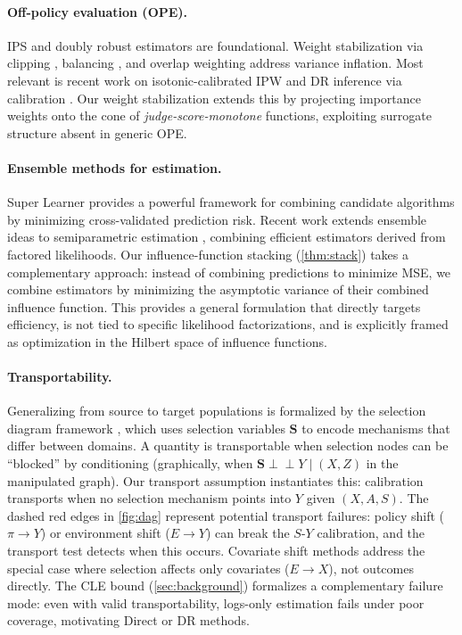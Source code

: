 \paragraph{Off-policy evaluation (OPE).}
IPS \citep{HorvitzThompson1952,Hajek1964Rejective} and doubly robust estimators \citep{BangRobins2005,JiangLi2016,KallusUehara2020DRL} are foundational.
Weight stabilization via clipping \citep{Ionides2008TruncatedIS}, balancing \citep{Kallus2018Balanced}, and overlap weighting \citep{LiMorganZaslavsky2018,Crump2009LimitedOverlap} address variance inflation.
Most relevant is recent work on isotonic-calibrated IPW \citep{vanDerLaanLinCaroneLuedtke2025StabIPW} and DR inference via calibration \citep{vanDerLaanLuedtkeCarone2024DRCalibration}.
Our weight stabilization extends this by projecting importance weights onto the cone of \emph{judge-score-monotone} functions, exploiting surrogate structure absent in generic OPE.

\paragraph{Ensemble methods for estimation.}
Super Learner \citep{vanderLaan2007SuperLearner} provides a powerful framework for combining candidate algorithms by minimizing cross-validated prediction risk.
Recent work extends ensemble ideas to semiparametric estimation \citep{ShinLiuColeFine2020EnsembleSemiparametric}, combining efficient estimators derived from factored likelihoods.
Our influence-function stacking (\cref{thm:stack}) takes a complementary approach: instead of combining predictions to minimize MSE, we combine estimators by minimizing the asymptotic variance of their combined influence function.
This provides a general formulation that directly targets efficiency, is not tied to specific likelihood factorizations, and is explicitly framed as optimization in the Hilbert space of influence functions.

\paragraph{Transportability.}
Generalizing from source to target populations is formalized by the selection diagram framework \citep{BareinboimPearl2013Algorithm,BareinboimPearl2013Meta,PearlBareinboim2014}, which uses selection variables $\mathbf{S}$ to encode mechanisms that differ between domains.
A quantity is transportable when selection nodes can be ``blocked'' by conditioning (graphically, when $\mathbf{S} \perp\!\!\perp Y \mid (X, Z)$ in the manipulated graph).
Our transport assumption instantiates this: calibration transports when no selection mechanism points into $Y$ given $(X, A, S)$.
The dashed red edges in \cref{fig:dag} represent potential transport failures: policy shift ($\pi \to Y$) or environment shift ($E \to Y$) can break the $S$-$Y$ calibration, and the transport test detects when this occurs.
Covariate shift methods \citep{Shimodaira2000CovShift,SugiyamaKrauledatMueller2007IWCV} address the special case where selection affects only covariates ($E \to X$), not outcomes directly.
The CLE bound (\cref{sec:background}) formalizes a complementary failure mode: even with valid transportability, logs-only estimation fails under poor coverage, motivating Direct or DR methods.
